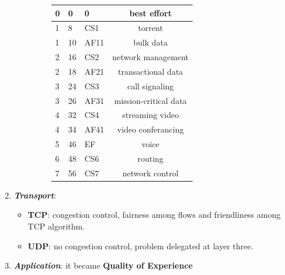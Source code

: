 \begin{enumerate}[nosep]
\begin{itemize}[nosep]
\begin{figure}[h]
\begin{tabular}{ | p{1cm} | p{2cm} | p{2cm} | c | }
                0 & 0 & 0 & best effort \\ \hline
                1 & 8 & CS1 & torrent \\ \hline
                1 & 10 & AF11 & bulk data \\ \hline
                2 & 16 & CS2 & network management \\ \hline
                2 & 18 & AF21 & transactional data \\ \hline
                3 & 24 & CS3 & call signaling \\ \hline
                3 & 26 & AF31 & mission-critical data \\ \hline
                4 & 32 & CS4 & streaming video \\ \hline
                4 & 34 & AF41 & video conferancing \\ \hline
                5 & 46 & EF & voice \\ \hline
                6 & 48 & CS6 & routing \\ \hline
                7 & 56 & CS7 & network control \\ \hline
            \end{tabular}
        \end{figure}
    \end{itemize}

    \item \textbf{\textit{Transport}}:
    \begin{itemize}[nosep]
        \item \textbf{TCP}: congestion control, fairness among flows and friendliness among TCP algorithm.
        \item \textbf{UDP}: no congestion control, problem delegated at layer three.
    \end{itemize}

    \item \textbf{\textit{Application}}: it became \textbf{Quality of Experience}

\end{enumerate}

